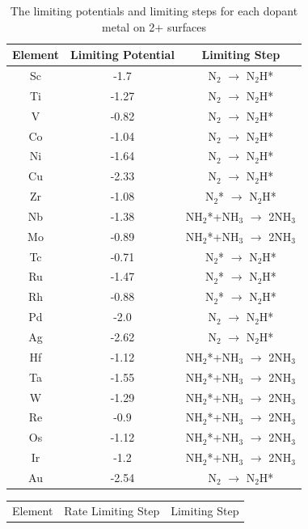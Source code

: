 \begin{table}
\begin{center}
\begin{tabular}{| c | c |c |}
\hline
Element & Limiting Potential & Limiting Step \\
\hline
Sc & -1.7 & N$_2$ $\rightarrow$ N$_2$H*\\
Ti & -1.27 & N$_2$ $\rightarrow$ N$_2$H*\\
V & -0.82 & N$_2$ $\rightarrow$ N$_2$H*\\
Co & -1.04 & N$_2$ $\rightarrow$ N$_2$H*\\
Ni & -1.64 & N$_2$ $\rightarrow$ N$_2$H*\\
Cu & -2.33 & N$_2$ $\rightarrow$ N$_2$H*\\
Zr & -1.08 & N$_2$* $\rightarrow$ N$_2$H*\\
Nb & -1.38 & NH$_2$*+NH$_3$ $\rightarrow$ 2NH$_3$\\
Mo & -0.89 & NH$_2$*+NH$_3$ $\rightarrow$ 2NH$_3$\\
Tc & -0.71 & N$_2$* $\rightarrow$ N$_2$H*\\
Ru & -1.47 & N$_2$* $\rightarrow$ N$_2$H*\\
Rh & -0.88 & N$_2$* $\rightarrow$ N$_2$H*\\
Pd & -2.0 & N$_2$ $\rightarrow$ N$_2$H*\\
Ag & -2.62 & N$_2$ $\rightarrow$ N$_2$H*\\
Hf & -1.12 & NH$_2$*+NH$_3$ $\rightarrow$ 2NH$_3$\\
Ta & -1.55 & NH$_2$*+NH$_3$ $\rightarrow$ 2NH$_3$\\
W & -1.29 & NH$_2$*+NH$_3$ $\rightarrow$ 2NH$_3$\\
Re & -0.9 & NH$_2$*+NH$_3$ $\rightarrow$ 2NH$_3$\\
Os & -1.12 & NH$_2$*+NH$_3$ $\rightarrow$ 2NH$_3$\\
Ir & -1.2 & NH$_2$*+NH$_3$ $\rightarrow$ 2NH$_3$\\
Au & -2.54 & N$_2$ $\rightarrow$ N$_2$H*\\
\hline
\end{tabular}
\end{center}
\caption{The limiting potentials and limiting steps for each dopant metal on 2+ surfaces}\label{table:limiting_steps}\end{table}\begin{table}
\begin{center}
\begin{tabular}{| c | c |c |}
\hline
Element & Rate Limiting Step & Limiting Step \\

\end{tabular}
\end{center}
\end{table}
